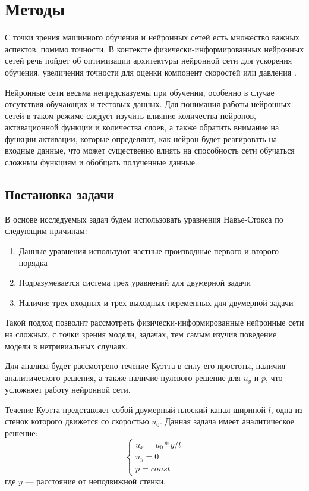 \chapter{Методы}
С точки зрения машинного обучения и нейронных сетей есть множество важных аспектов,
помимо точности. В контексте физически-информированных нейронных сетей речь пойдет
об оптимизации архитектуры нейронной сети для ускорения обучения, увеличения точности
для оценки компонент скоростей или давления \cite{Tommaso2024pinn}.

Нейронные сети весьма непредсказуемы при обучении, особенно в случае отсутствия
обучающих и тестовых данных. Для понимания работы нейронных сетей в таком режиме
следует изучить влияние количества нейронов, активационной функции и количества слоев,
а также обратить внимание на функции активации, которые определяют,
как нейрон будет реагировать на входные данные, что может существенно влиять на способность
сети обучаться сложным функциям и обобщать полученные данные.
\section{Постановка задачи}
В основе исследуемых задач будем использовать уравнения Навье-Стокса по следующим
причинам:
\begin{enumerate}
    \item Данные уравнения используют частные производные первого и второго порядка
    \item Подразумевается система трех уравнений для двумерной задачи
    \item Наличие трех входных и трех выходных переменных для двумерной задачи
\end{enumerate}
Такой подход позволит рассмотреть физически-информированные нейронные сети на сложных,
с точки зрения модели, задачах, тем самым изучив поведение модели в нетривиальных случаях.

Для анализа будет рассмотрено течение Куэтта в силу его простоты, наличия аналитического
решения, а также наличие нулевого решение для $u_y$ и $p$, что усложняет работу нейронной
сети.

Течение Куэтта представляет собой двумерный плоский канал шириной $l$, одна из стенок которого 
движется со скоростью $u_0$. Данная задача имеет аналитическое решение:
\begin{equation}
    \begin{cases}
        u_x = u_0 * y / l \\
        u_y = 0 \\
        p = const
    \end{cases}
\end{equation}
где $y$ --- расстояние от неподвижной стенки.

